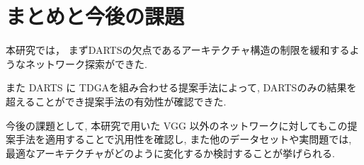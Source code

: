 \documentclass[a4paper,twoside,twocolumn,10pt]{article}
\begin{document}
\section{まとめと今後の課題}
本研究では，
まずDARTSの欠点であるアーキテクチャ構造の制限を緩和するようなネットワーク探索ができた.

また
DARTS に TDGAを組み合わせる提案手法によって,
DARTSのみの結果を超えることができ提案手法の有効性が確認できた.


今後の課題として,
本研究で用いた VGG 以外のネットワークに対してもこの提案手法を適用することで汎用性を確認し,
また他のデータセットや実問題では, 最適なアーキテクチャがどのように変化するか検討することが挙げられる.




\end{document}
